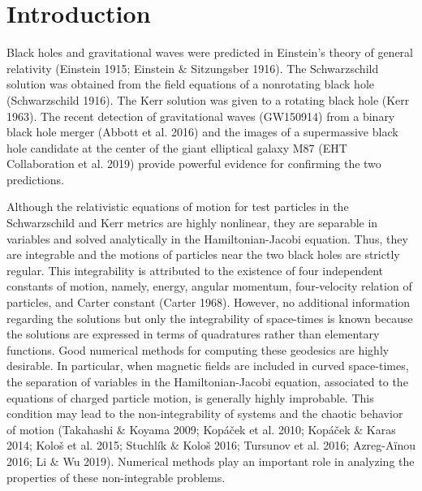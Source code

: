 \documentclass[preprint2]{aastex}
\begin{document}

\section{Introduction}
\label{sec:intro}

Black holes and gravitational waves were predicted in Einstein's
theory of general relativity (Einstein 1915; Einstein $\&$
Sitzungsber 1916). The Schwarzschild solution was obtained from
the field equations of a nonrotating black hole (Schwarzschild
1916). The Kerr solution was given to a rotating black hole (Kerr
1963). The recent detection of gravitational waves (GW150914) from
a binary black hole merger (Abbott et al. 2016) and the images of
a supermassive black hole candidate at the center of the giant
elliptical galaxy M87 (EHT Collaboration et al. 2019) provide
powerful evidence for confirming the two predictions.

Although the relativistic equations of motion for test particles
in the Schwarzschild and Kerr metrics are highly nonlinear, they
are separable in variables and solved analytically in the
Hamiltonian-Jacobi equation. Thus, they are integrable and the
motions of particles near the two black holes are strictly
regular. This integrability is attributed to the existence of four
independent constants of motion, namely, energy, angular momentum,
four-velocity relation of particles, and Carter constant (Carter
1968). However, no additional information regarding the solutions
but only the integrability of space-times is known because the
solutions are expressed in terms of quadratures rather than
elementary functions. Good numerical methods for computing these
geodesics are highly desirable. In particular, when magnetic
fields are included in curved space-times, the separation of
variables in the Hamiltonian-Jacobi equation, associated to the
equations of charged particle motion, is generally highly
improbable. This condition may lead to the non-integrability of
systems and the chaotic behavior of motion (Takahashi $\&$ Koyama
2009; Kop\'{a}\v{c}ek et al. 2010; Kop\'{a}\v{c}ek $\&$ Karas
2014; Kolo\v{s} et al. 2015; Stuchl\'{i}k $\&$ Kolo\v{s} 2016;
Tursunov et al. 2016; Azreg-A\"{i}nou 2016; Li $\&$ Wu 2019).
Numerical methods play an important role in analyzing the
properties of these non-integrable problems.
\end{document}
